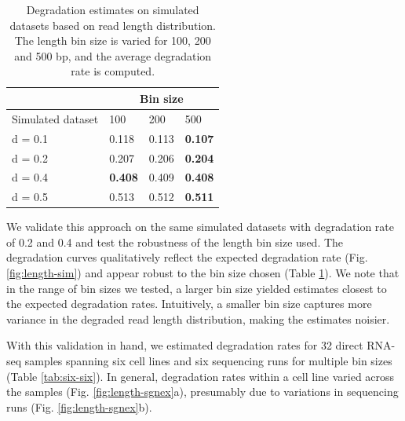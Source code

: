 \begin{table}[H]
  \centering
    \begin{tabular}{|p{3.5cm}|p{1.5cm}|p{1.5cm}|p{1.5cm}|}
\cline{2-4}    \multicolumn{1}{r|}{} & \multicolumn{3}{c|}{Bin size} \bigstrut\\
    \hline
    Simulated dataset & 100   & 200   & 500 \bigstrut\\
    \hline
    d = 0.1 & 0.118 & 0.113 & \textbf{0.107} \bigstrut\\
    \hline
    d = 0.2 & 0.207 & 0.206 & \textbf{0.204} \bigstrut\\
    \hline
    d = 0.4 & \textbf{0.408} & 0.409 & \textbf{0.408} \bigstrut\\
    \hline
    d = 0.5 & 0.513 & 0.512 & \textbf{0.511} \bigstrut\\
    \hline
    \end{tabular}%
  \caption[Degradation estimates on simulated datasets based on read length distribution]{Degradation estimates on simulated datasets based on read length distribution. The length bin size is varied for 100, 200 and 500 bp, and the average degradation rate is computed.}
  \label{tab:binsize}%
\end{table}%

We validate this approach on the same simulated datasets with degradation rate of 0.2 and 0.4 and test the robustness of the length bin size used. The degradation curves qualitatively reflect the expected degradation rate (Fig. \ref{fig:length-sim}) and appear robust to the bin size chosen (Table \ref{tab:binsize}). We note that in the range of bin sizes we tested, a larger bin size yielded estimates closest to the expected degradation rates. Intuitively, a smaller bin size captures more variance in the degraded read length distribution, making the estimates noisier.         

With this validation in hand, we estimated degradation rates for 32 direct RNA-seq samples spanning six cell lines and six sequencing runs for multiple bin sizes (Table \ref{tab:six-six}). In general, degradation rates within a cell line varied across the samples (Fig. \ref{fig:length-sgnex}a), presumably due to variations in sequencing runs (Fig. \ref{fig:length-sgnex}b).   

